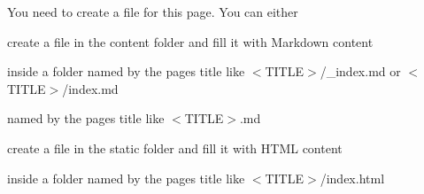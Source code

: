 You need to create a file for this page. You can either


\begin{DoxyItemize}
\item create a file in the {\ttfamily content} folder and fill it with Markdown content
\begin{DoxyItemize}
\item inside a folder named by the page\textquotesingle{}s title like {\ttfamily $<$TITLE$>$/\+\_\+index.md} or {\ttfamily $<$TITLE$>$/index.md}
\item named by the page\textquotesingle{}s title like {\ttfamily $<$TITLE$>$.md}
\end{DoxyItemize}
\item create a file in the {\ttfamily static} folder and fill it with HTML content
\begin{DoxyItemize}
\item inside a folder named by the page\textquotesingle{}s title like {\ttfamily $<$TITLE$>$/index.html} 
\end{DoxyItemize}
\end{DoxyItemize}